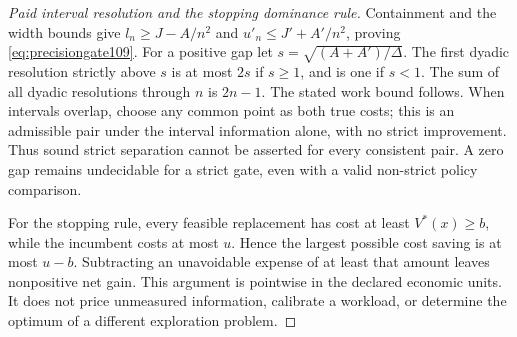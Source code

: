 \begin{proof}[Paid interval resolution and the stopping dominance rule]
Containment and the width bounds give $l_n\ge J-A/n^2$ and $u'_n\le J'+A'/n^2$, proving \eqref{eq:precisiongate109}. For a positive gap let $s=\sqrt{(A+A')/\Delta}$. The first dyadic resolution strictly above $s$ is at most $2s$ if $s\ge1$, and is one if $s<1$. The sum of all dyadic resolutions through $n$ is $2n-1$. The stated work bound follows. When intervals overlap, choose any common point as both true costs; this is an admissible pair under the interval information alone, with no strict improvement. Thus sound strict separation cannot be asserted for every consistent pair. A zero gap remains undecidable for a strict gate, even with a valid non-strict policy comparison.

For the stopping rule, every feasible replacement has cost at least $V^*(x)\ge b$, while the incumbent costs at most $u$. Hence the largest possible cost saving is at most $u-b$. Subtracting an unavoidable expense of at least that amount leaves nonpositive net gain. This argument is pointwise in the declared economic units. It does not price unmeasured information, calibrate a workload, or determine the optimum of a different exploration problem.
\end{proof}
